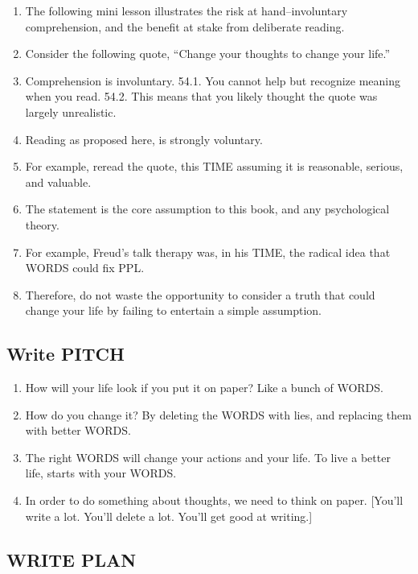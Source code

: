 \documentclass[
]{book}
\providecommand{\tightlist}{%
  \setlength{\itemsep}{0pt}\setlength{\parskip}{0pt}}
\begin{document}
\begin{enumerate}
\def\labelenumi{\arabic{enumi}.}
\setcounter{enumi}{51}
\item
  The following mini lesson illustrates the risk at hand--involuntary
  comprehension, and the benefit at stake from deliberate reading.
\item
  Consider the following quote, ``Change your thoughts to change your life.''
\item
  Comprehension is involuntary.
  54.1. You cannot help but recognize meaning when you read.
  54.2. This means that you likely thought the quote was largely unrealistic.
\item
  Reading as proposed here, is strongly voluntary.
\item
  For example, reread the quote, this TIME assuming it is reasonable, serious, and
  valuable.
\item
  The statement is the core assumption to this book, and any psychological
  theory.
\item
  For example, Freud's talk therapy was, in his TIME, the radical idea that WORDS could fix PPL.
\item
  Therefore, do not waste the opportunity to consider a truth that could change
  your life by failing to entertain a simple assumption.
\end{enumerate}

\hypertarget{write-pitch}{%
\subsection{Write PITCH}\label{write-pitch}}

\begin{enumerate}
\def\labelenumi{\arabic{enumi}.}
\setcounter{enumi}{59}
\tightlist
\item
  How will your life look if you put it on paper? Like a bunch of WORDS.
\item
  How do you change it? By deleting the WORDS with lies, and replacing them
  with better WORDS.
\item
  The right WORDS will change your actions and your life. To live a better life,
  starts with your WORDS.
\item
  In order to do something about thoughts, we need to think on
  paper. {[}You'll write a lot. You'll delete a lot. You'll get good at writing.{]}
\end{enumerate}

\hypertarget{write-plan}{%
\subsection{WRITE PLAN}\label{write-plan}}
\end{document}

